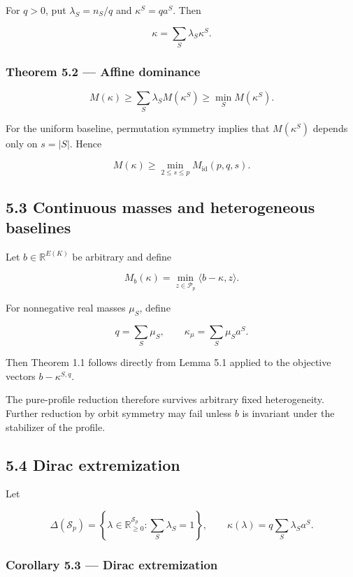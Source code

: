 \documentclass[11pt,a4paper]{article}
\begin{document}
For \(q>0\), put \(\lambda_S=n_S/q\) and \(\kappa^S=qa^S\). Then

\[
\kappa=\sum_S\lambda_S\kappa^S.
\tag{5.2}
\]

\subsubsection{Theorem 5.2 --- Affine dominance}\label{theorem-5.2-affine-dominance}

\[
\boxed{
M(\kappa)
\ge
\sum_S\lambda_SM(\kappa^S)
\ge
\min_SM(\kappa^S).
}
\tag{5.3}
\]

For the uniform baseline, permutation symmetry implies that \(M(\kappa^S)\) depends only on \(s=|S|\). Hence

\[
M(\kappa)\ge\min_{2\le s\le p}M_{\mathrm{id}}(p,q,s).
\tag{5.4}
\]

\subsection{5.3 Continuous masses and heterogeneous baselines}\label{continuous-masses-and-heterogeneous-baselines}

Let \(b\in\mathbb R^{E(K)}\) be arbitrary and define

\[
M_b(\kappa)=\min_{z\in\mathcal P_p}\langle b-\kappa,z\rangle.
\]

For nonnegative real masses \(\mu_S\), define

\[
q=\sum_S\mu_S,
\qquad
\kappa_\mu=\sum_S\mu_Sa^S.
\]

Then Theorem 1.1 follows directly from Lemma 5.1 applied to the objective vectors \(b-\kappa^{S,q}\).

The pure-profile reduction therefore survives arbitrary fixed heterogeneity. Further reduction by orbit symmetry may fail unless \(b\) is invariant under the stabilizer of the profile.

\subsection{5.4 Dirac extremization}\label{dirac-extremization}

Let

\[
\Delta(\mathcal S_p)
=
\left\{
\lambda\in\mathbb R_{\ge0}^{\mathcal S_p}:
\sum_S\lambda_S=1
\right\},
\qquad
\kappa(\lambda)=q\sum_S\lambda_Sa^S.
\]

\subsubsection{Corollary 5.3 --- Dirac extremization}\label{corollary-5.3-dirac-extremization}
\end{document}
